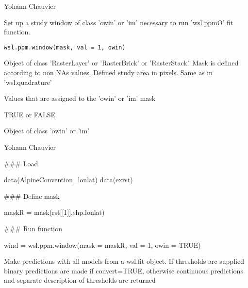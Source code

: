 \documentclass[a4paper]{book}
\begin{document}
%
\begin{Author}\relax
Yohann Chauvier
\end{Author}
%
\begin{Description}\relax
Set up a study window of class 'owin' or 'im' necessary to run 'wsl.ppmO' fit function.
\end{Description}
%
\begin{Usage}
\begin{verbatim}
wsl.ppm.window(mask, val = 1, owin)
\end{verbatim}
\end{Usage}
%
\begin{Arguments}
\begin{ldescription}
\item[\code{mask}] Object of class 'RasterLayer' or 'RasterBrick' or 'RasterStack'. Mask is defined
according to non NAs values. Defined study area in pixels. Same as in 'wsl.quadrature'

\item[\code{val}] Values that are assigned to the 'owin' or 'im' mask

\item[\code{owin}] TRUE or FALSE
\end{ldescription}
\end{Arguments}
%
\begin{Value}
Object of class 'owin' or 'im'
\end{Value}
%
\begin{Author}\relax
Yohann Chauvier
\end{Author}
%
\begin{Examples}
\begin{ExampleCode}

### Load

data(AlpineConvention_lonlat)
data(exrst)

### Define mask

maskR = mask(rst[[1]],shp.lonlat)

### Run function

wind = wsl.ppm.window(mask = maskR,
                      val = 1,
                      owin = TRUE)

\end{ExampleCode}
\end{Examples}
%
\begin{Description}\relax
Make predictions with all models from a wsl.fit object. If thresholds are supplied
binary predictions are made if convert=TRUE, otherwise continuous predictions and
separate description of thresholds are returned
\end{Description}
\end{document}
